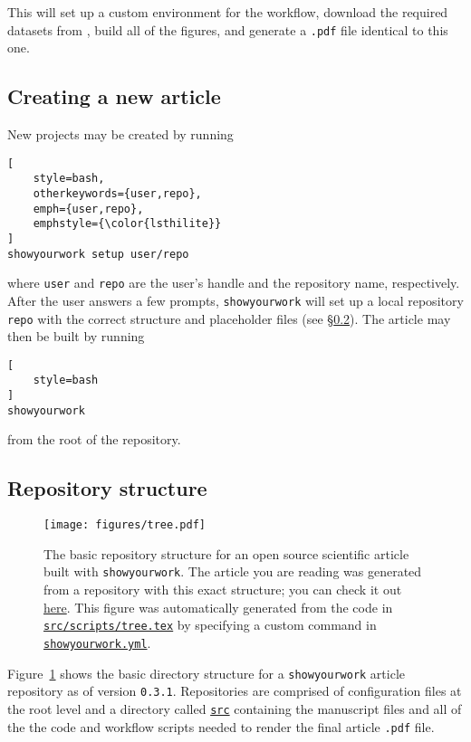 \documentclass{aastex631}
\newcommand\VERSION{\texttt{0.3.1}\xspace}
\newcommand\syw{\texttt{showyourwork}\xspace}
\newcommand\pdf{\texttt{.pdf}\xspace}
\newcommand\repoargurl{https://github.com/showyourwork/showyourwork-paper}
\newcommand\commiturl{\repoargurl/tree/\GitHubSHA}
\newcommand\fileurl[1]{\repoargurl/blob/\GitHubSHA/#1}
\newcommand\repoargfile[1]{\href{\fileurl{#1}}{\texttt{#1}\xspace}}
\newcommand\userarg{\texttt{\color{lsthilite}user}\xspace}
\newcommand\repoarg{\texttt{\color{lsthilite}repo}\xspace}
\begin{document}
\noindent This will set up a custom \conda environment for the workflow, download the required datasets from \Zenodo, build all of the figures, and generate a \pdf file identical to this one.

\subsection{Creating a new article}
\label{sec:usage:new}
New projects may be created by running\\

\noindent\begin{minipage}{\linewidth}
\begin{lstlisting}[
    style=bash,
    otherkeywords={user,repo},
    emph={user,repo},
    emphstyle={\color{lsthilite}}
]
showyourwork setup user/repo
\end{lstlisting}
\end{minipage}



\noindent where \userarg and \repoarg are the user's \GitHub handle and the repository name, respectively. 
After the user answers a few prompts, \syw will set up a local \git repository \repoarg with the correct structure and placeholder files (see \S\ref{sec:usage:struct}).
The article may then be built by running\\

\noindent\begin{minipage}{\linewidth}
\begin{lstlisting}[
    style=bash
]
showyourwork
\end{lstlisting}
\end{minipage}

\noindent from the root of the repository.

\subsection{Repository structure}
\label{sec:usage:struct}
%
\begin{figure}[p!]
    \begin{centering}
        \texttt{[image: figures/tree.pdf]}
        \caption{
            The basic repository structure for an open source scientific article built with \syw.
            The article you are reading was generated from a repository with this exact structure; you can check it out \href{\commiturl}{here}.
            This figure was automatically generated from the \TikZ code in \repoargfile{src/scripts/tree.tex} by specifying a custom command in \repoargfile{showyourwork.yml}.
        }
        \label{fig:tree}
    \end{centering}
\end{figure}
%
Figure~\ref{fig:tree} shows the basic directory structure for a \syw article repository as of version \VERSION{}.
Repositories are comprised of configuration files at the root level and a directory called \repoargfile{src} containing the manuscript files and all of the the code and workflow scripts needed to render the final article \pdf file.
%
\end{document}
